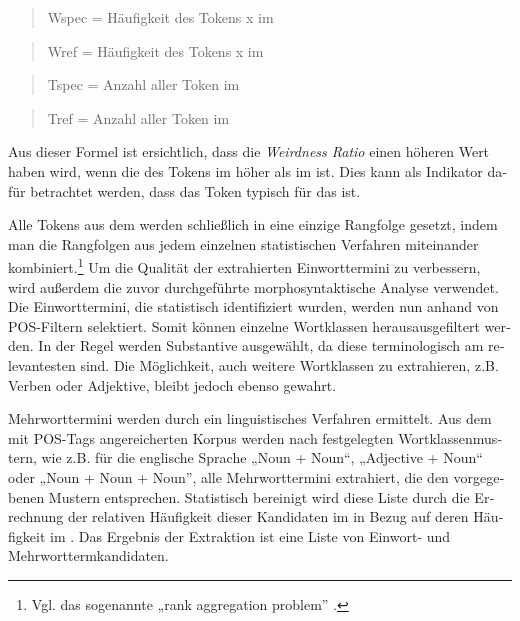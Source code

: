 \documentclass[output=paper]{LSP/langsci}
\begin{document}
\begin{otherlanguage}{ngerman}
\begin{quote}
Wspec = Häufigkeit des Tokens x im 
\end{quote}

\begin{quote}
Wref = Häufigkeit des Tokens x im  
\end{quote}

\begin{quote}
Tspec = Anzahl aller Token im 
\end{quote}

\begin{quote}
Tref = Anzahl aller Token im 
\end{quote}


Aus dieser Formel ist ersichtlich, dass die \textit{Weirdness Ratio} einen höheren Wert haben wird, wenn die  des Tokens im  höher als im  ist. Dies kann als Indikator dafür betrachtet werden, dass das Token typisch für das  ist.

Alle Tokens aus dem  werden schließlich in eine einzige Rangfolge gesetzt, indem man die Rangfolgen aus jedem einzelnen statistischen Verfahren miteinander kombiniert.\footnote{Vgl. das sogenannte „rank aggregation problem” \citep{DworkEtAl2001}.} Um die Qualität der extrahierten Einworttermini zu verbessern, wird außerdem die zuvor durchgeführte morphosyntaktische Analyse verwendet. Die Einworttermini, die statistisch identifiziert wurden, werden nun anhand von POS-Filtern selektiert. Somit können einzelne Wortklassen herausausgefiltert werden. In der Regel werden Substantive ausgewählt, da diese terminologisch am relevantesten sind. Die Möglichkeit, auch weitere Wortklassen zu extrahieren, z.B. Verben oder Adjektive, bleibt jedoch ebenso gewahrt. 

Mehrworttermini werden durch ein linguistisches Verfahren ermittelt. Aus dem mit POS-Tags angereicherten Korpus werden nach festgelegten Wortklassenmustern, wie z.B. für die englische Sprache „Noun + Noun“, „Adjective + Noun“ oder „Noun + Noun + Noun”, alle Mehrworttermini extrahiert, die den vorgegebenen Mustern entsprechen. Statistisch bereinigt wird diese Liste durch die Errechnung der relativen Häufigkeit dieser Kandidaten im  in Bezug auf deren Häufigkeit im . Das Ergebnis der Extraktion ist eine Liste von Einwort- und Mehrworttermkandidaten.


\end{otherlanguage}
\end{document}
